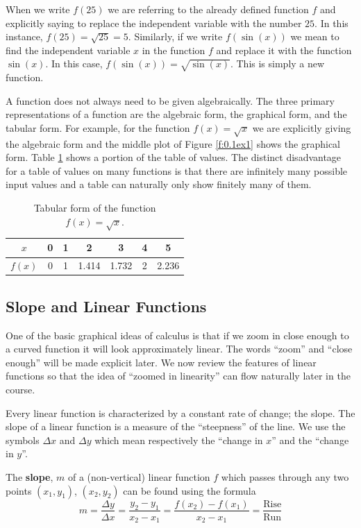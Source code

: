 When we write $f(25)$ we are referring to the already defined function $f$ and explicitly
saying to replace the independent variable with the number $25$.  In this instance, $f(25)
= \sqrt{25} = 5$.  Similarly, if we write $f(\sin(x))$ we mean to find the independent
variable $x$ in the function $f$ and replace it with the function $\sin(x)$.  In this
case, $f(\sin(x)) = \sqrt{\sin(x)}$.  This is simply a new function.

A function does not always need to be given algebraically.  The three primary
representations of a function are the algebraic form, the graphical form, and the tabular
form.  For example, for the function $f(x) = \sqrt{x}$ we are explicitly giving the
algebraic form and the middle plot of Figure \ref{f:0.1ex1} shows the graphical form.
Table \ref{t:0.1ex1} shows a portion of the table of values.  The distinct disadvantage
for a table of values on many functions is that there are infinitely many possible input
values and a table can naturally only show finitely many of them.

\begin{table}[ht!]
    \centering
    \begin{tabular}{|c||c|c|c|c|c|c|}
        \hline
        $x$ & 0 & 1 & 2 & 3 & 4 & 5 \\ \hline
        $f(x)$ & 0 & 1 & 1.414 & 1.732 & 2 & 2.236 \\ \hline
    \end{tabular}
    \caption{Tabular form of the function $f(x) = \sqrt{x}$.}
    \label{t:0.1ex1}
\end{table}






\subsection*{Slope and Linear Functions}
One of the basic graphical ideas of calculus is that if we zoom in close enough to a
curved function it will look approximately linear.  The words ``zoom'' and ``close
enough'' will be made explicit later.  We now review the features of linear functions so
that the idea of ``zoomed in linearity'' can flow naturally later in the course.  

Every linear function is characterized by a constant rate of change; the slope.  The slope
of a linear function is a measure of the ``steepness'' of the line.  We use the symbols
$\Delta x$ and $\Delta y$ which mean respectively the ``change in $x$'' and the ``change in
$y$''.  
\begin{definition}
    The {\bf slope}, $m$ of a (non-vertical) linear function $f$ which passes through any
    two points $(x_1,y_1)$, $(x_2,y_2)$ can be found using the formula
    \[ m = \frac{\Delta y}{\Delta x} = \frac{y_2 - y_1}{x_2 - x_1} =
    \frac{f(x_2)-f(x_1)}{x_2-x_1} = \frac{\text{Rise}}{\text{Run}} \]
\end{definition}

